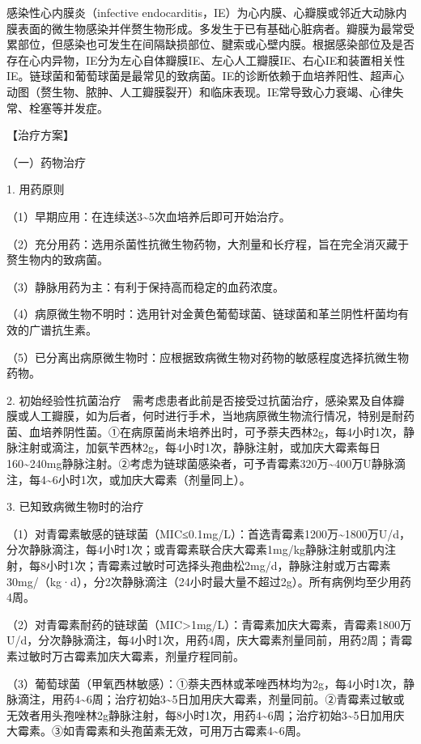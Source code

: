 感染性心内膜炎（infective
endocarditis，IE）为心内膜、心瓣膜或邻近大动脉内膜表面的微生物感染并伴赘生物形成。多发生于已有基础心脏病者。瓣膜为最常受累部位，但感染也可发生在间隔缺损部位、腱索或心壁内膜。根据感染部位及是否存在心内异物，IE分为左心自体瓣膜IE、左心人工瓣膜IE、右心IE和装置相关性IE。链球菌和葡萄球菌是最常见的致病菌。IE的诊断依赖于血培养阳性、超声心动图（赘生物、脓肿、人工瓣膜裂开）和临床表现。IE常导致心力衰竭、心律失常、栓塞等并发症。

【治疗方案】

{（一）药物治疗}

1. 用药原则

（1）早期应用：在连续送3\textasciitilde{}5次血培养后即可开始治疗。

（2）充分用药：选用杀菌性抗微生物药物，大剂量和长疗程，旨在完全消灭藏于赘生物内的致病菌。

（3）静脉用药为主：有利于保持高而稳定的血药浓度。

（4）病原微生物不明时：选用针对金黄色葡萄球菌、链球菌和革兰阴性杆菌均有效的广谱抗生素。

（5）已分离出病原微生物时：应根据致病微生物对药物的敏感程度选择抗微生物药物。

2.
初始经验性抗菌治疗　需考虑患者此前是否接受过抗菌治疗，感染累及自体瓣膜或人工瓣膜，如为后者，何时进行手术，当地病原微生物流行情况，特别是耐药菌、血培养阴性菌。①在病原菌尚未培养出时，可予萘夫西林2g，每4小时1次，静脉注射或滴注，加氨苄西林2g，每4小时1次，静脉注射，或加庆大霉素每日160\textasciitilde{}240mg静脉注射。②考虑为链球菌感染者，可予青霉素320万\textasciitilde{}400万U静脉滴注，每4\textasciitilde{}6小时1次，或加庆大霉素（剂量同上）。

3. 已知致病微生物时的治疗

（1）对青霉素敏感的链球菌（MIC≤0.1mg/L）：首选青霉素1200万\textasciitilde{}1800万U/d，分次静脉滴注，每4小时1次；或青霉素联合庆大霉素1mg/kg静脉注射或肌内注射，每8小时1次；青霉素过敏时可选择头孢曲松2mg/d，静脉注射或万古霉素30mg/（kg·d），分2次静脉滴注（24小时最大量不超过2g）。所有病例均至少用药4周。

（2）对青霉素耐药的链球菌（MIC\textgreater{}1mg/L）：青霉素加庆大霉素，青霉素1800万U/d，分次静脉滴注，每4小时1次，用药4周，庆大霉素剂量同前，用药2周；青霉素过敏时万古霉素加庆大霉素，剂量疗程同前。

（3）葡萄球菌（甲氧西林敏感）：①萘夫西林或苯唑西林均为2g，每4小时1次，静脉滴注，用药4\textasciitilde{}6周；治疗初始3\textasciitilde{}5日加用庆大霉素，剂量同前。②青霉素过敏或无效者用头孢唑林2g静脉注射，每8小时1次，用药4\textasciitilde{}6周；治疗初始3\textasciitilde{}5日加用庆大霉素。③如青霉素和头孢菌素无效，可用万古霉素4\textasciitilde{}6周。

